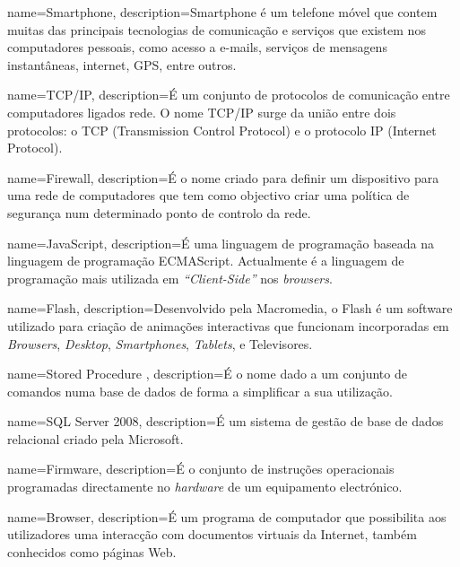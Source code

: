 {
	name={Smartphone},
	description={Smartphone é um telefone móvel que contem muitas das principais tecnologias de comunicação e serviços que existem nos computadores pessoais, como acesso a e-mails, serviços de mensagens instantâneas, internet, GPS, entre outros.}
}

{
	name={TCP/IP},
	description={É um conjunto de protocolos de comunicação entre computadores ligados rede. O nome TCP/IP surge da união entre dois protocolos: o TCP (Transmission Control Protocol) e o protocolo IP (Internet Protocol).}
}

{
	name={Firewall},
	description={É o nome criado para definir um dispositivo para uma rede de computadores que tem como objectivo criar uma política de segurança num determinado ponto de controlo da rede.}
}

{
	name={JavaScript},
	description={É uma linguagem de programação baseada na linguagem de programação ECMAScript. Actualmente é a linguagem de programação mais utilizada em \textit{``Client-Side''} nos \textit{browsers}.}
}

{
	name={Flash},
	description={Desenvolvido pela Macromedia, o Flash é um software utilizado para criação de animações interactivas que funcionam incorporadas em \textit{Browsers}, \textit{Desktop}, \textit{Smartphones}, \textit{Tablets}, e Televisores.}
}


{
	name={Stored Procedure },
	description={É o nome dado a um conjunto de comandos numa base de dados de forma a simplificar a sua utilização.}
}

{
	name={SQL Server 2008},
	description={É um sistema de gestão de base de dados relacional criado pela Microsoft.}
}

{
	name={Firmware},
	description={É o conjunto de instruções operacionais programadas directamente no \textit{hardware} de um equipamento electrónico.}
}

{
	name={Browser},
	description={É um programa de computador que possibilita aos utilizadores uma interacção com documentos virtuais da Internet, também conhecidos como páginas Web.}
}

